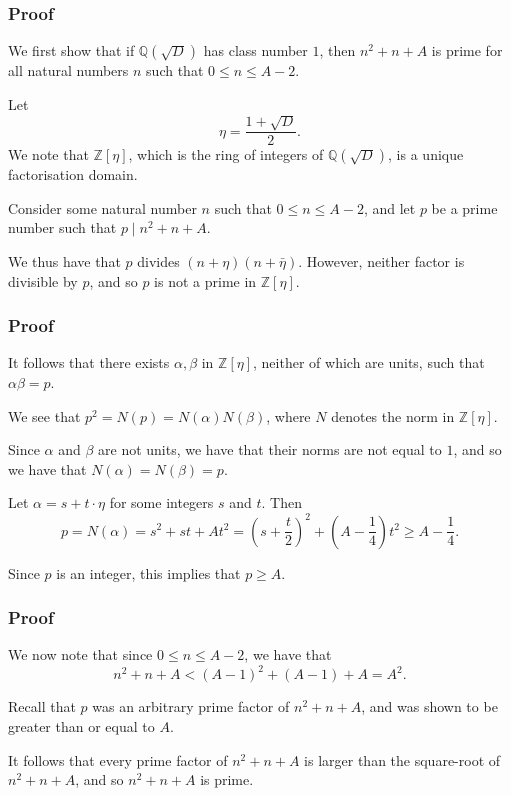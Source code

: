 \documentclass[handout]{beamer}
\begin{document}
\begin{frame}

	\frametitle{Proof}

	We first show that if $\mathbb{Q}(\sqrt{D})$ has class number $1$, then $n^2 + n + A$ is prime for all natural numbers $n$ such that $0 \leq n \leq A - 2$. \pause

	Let
	\[
		\eta = \frac{1 + \sqrt{D}}{2}.
	\]
	We note that $\mathbb{Z}[\eta]$, which is the ring of integers of $\mathbb{Q}(\sqrt{D})$, is a unique factorisation domain. \pause

	Consider some natural number $n$ such that $0 \leq n \leq A - 2$, and let $p$ be a prime number such that $p \mid n^2 + n + A$. \pause

	We thus have that $p$ divides $(n + \eta)(n + \bar{\eta})$. However, neither factor is divisible by $p$, and so $p$ is not a prime in $\mathbb{Z}[\eta]$.

\end{frame}

\begin{frame}

	\frametitle{Proof}

	It follows that there exists $\alpha, \beta$ in $\mathbb{Z}[\eta]$, neither of which are units, such that $\alpha \beta = p$. \pause

	We see that $p^2 = N(p) = N(\alpha) N(\beta)$, where $N$ denotes the norm in $\mathbb{Z}[\eta]$. \pause

	Since $\alpha$ and $\beta$ are not units, we have that their norms are not equal to $1$, and so we have that $N(\alpha) = N(\beta) = p$. \pause

	Let $\alpha = s + t \cdot \eta$ for some integers $s$ and $t$. Then 
	\[
		p = N(\alpha) = s^2 + st + At^2 = {\left( s + \frac{t}{2} \right)}^2 + \left(A - \frac{1}{4} \right) t^2 \geq A - \frac{1}{4}.
	\] \pause

	Since $p$ is an integer, this implies that $p \geq A$.

\end{frame}

\begin{frame}

	\frametitle{Proof}

	We now note that since $0 \leq n \leq A - 2$, we have that
	\[
		n^2 + n + A < {(A - 1)}^2 + (A - 1) + A = A^2.
	\] \pause

	Recall that $p$ was an arbitrary prime factor of $n^2 + n + A$, and was shown to be greater than or equal to $A$. \pause

	It follows that every prime factor of $n^2 + n + A$ is larger than the square-root of $n^2 + n + A$, and so $n^2 + n + A$ is prime.

\end{frame}
\end{document}
